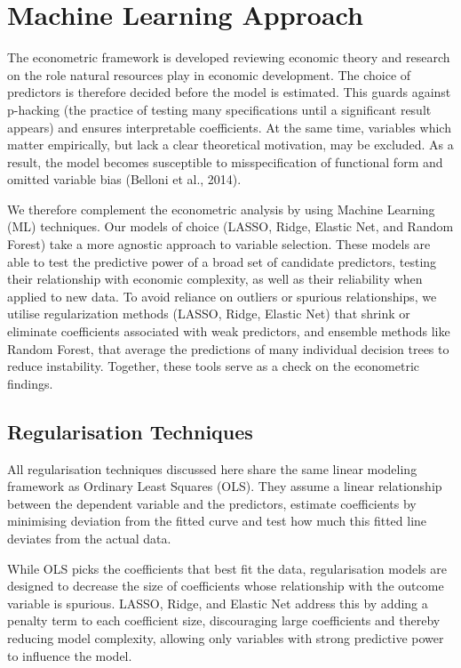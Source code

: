 \documentclass[12pt,a4paper]{report}
\begin{document}
\section{Machine Learning Approach}

The econometric framework is developed reviewing economic theory and research on the role natural resources play in economic development. The choice of predictors is therefore decided before the model is estimated. This guards against p-hacking (the practice of testing many specifications until a significant result appears) and ensures interpretable coefficients. At the same time, variables which matter empirically, but lack a clear theoretical motivation, may be excluded. As a result, the model becomes susceptible to misspecification of functional form and omitted variable bias (Belloni et al., 2014).

We therefore complement the econometric analysis by using Machine Learning (ML) techniques. Our models of choice (LASSO, Ridge, Elastic Net, and Random Forest) take a more agnostic approach to variable selection. These models are able to test the predictive power of a broad set of candidate predictors, testing their relationship with economic complexity, as well as their reliability when applied to new data. To avoid reliance on outliers or spurious relationships, we utilise regularization methods (LASSO, Ridge, Elastic Net) that shrink or eliminate coefficients associated with weak predictors, and ensemble methods like Random Forest, that average the predictions of many individual decision trees to reduce instability. Together, these tools serve as a check on the econometric findings.

\subsection{Regularisation Techniques}

All regularisation techniques discussed here share the same linear modeling framework as Ordinary Least Squares (OLS). They assume a linear relationship between the dependent variable and the predictors, estimate coefficients by minimising deviation from the fitted curve and test how much this fitted line deviates from the actual data.

While OLS picks the coefficients that best fit the data, regularisation models are designed to decrease the size of coefficients whose relationship with the outcome variable is spurious. LASSO, Ridge, and Elastic Net address this by adding a penalty term to each coefficient size, discouraging large coefficients and thereby reducing model complexity, allowing only variables with strong predictive power to influence the model.
\end{document}
